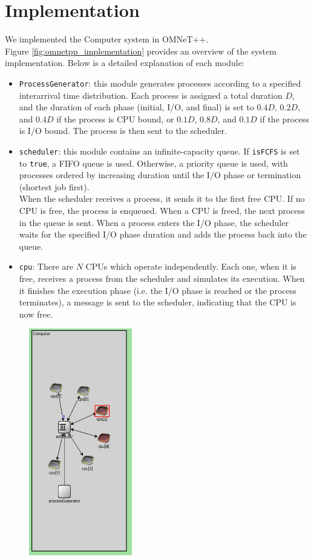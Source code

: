 \chapter{Implementation}
We implemented the Computer system in OMNeT++.\\
Figure \autoref{fig:omnetpp_implementation} provides an overview of the system implementation. Below is a detailed explanation of each module:
\begin{itemize}
    \item \texttt{ProcessGenerator}: this module generates processes according to a specified interarrival time distribution. Each process is assigned a total duration $D$, and the duration of each phase (initial, I/O, and final) is set to $0.4 D$, $0.2 D$, and $0.4 D$ if the process is CPU bound, or $0.1 D$, $0.8 D$, and $0.1 D$ if the process is I/O bound. The process is then sent to the scheduler.
    \item \texttt{scheduler}: this module contains an infinite-capacity queue. If \texttt{isFCFS} is set to \texttt{true}, a FIFO queue is used. Otherwise, a priority queue is used, with processes ordered by increasing duration until the I/O phase or termination (shortest job first).\\
    When the scheduler receives a process, it sends it to the first free CPU. If no CPU is free, the process is enqueued. When a CPU is freed, the next process in the queue is sent.
    When a process enters the I/O phase, the scheduler waits for the specified I/O phase duration and adds the process back into the queue.
    \item \texttt{cpu}: There are $N$ CPUs which operate independently. Each one, when it is free, receives a process from the scheduler and simulates its execution. When it finishes the execution phase (i.e. the I/O phase is reached or the process terminates), a message is sent to the scheduler, indicating that the CPU is now free.
\end{itemize}

\begin{figure}[H]
    \captionsetup{type=figure}
    \centering
    \includegraphics[width=0.4\textwidth]{images/example/sim_schema.png}
    \label{fig:omnetpp_implementation}
\end{figure}

